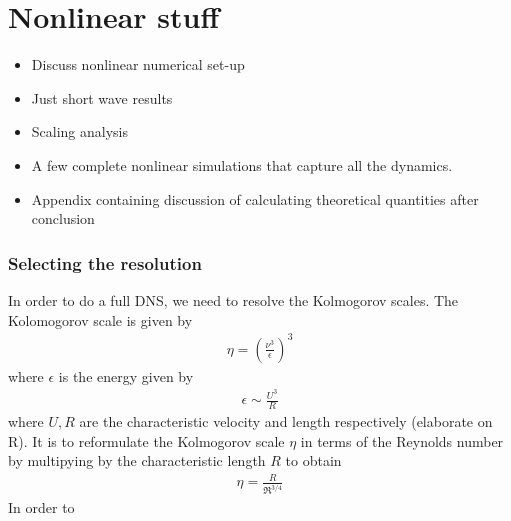 %
% 
\chapter{Nonlinear stuff}

\begin{itemize}
\item Discuss nonlinear numerical set-up
\item Just short wave results
\item Scaling analysis 
\item A few complete nonlinear simulations that capture all the dynamics.
\item Appendix containing discussion of calculating theoretical quantities after conclusion
\end{itemize}

\subsection{Selecting the resolution}

In order to do a full DNS, we need to resolve the Kolmogorov scales. The Kolomogorov scale is given by
\begin{align}
\eta = \left(\frac{\nu^{3}}{\epsilon}\right)^{3}
\end{align}
where $\epsilon$ is the energy given by
\begin{align}
\epsilon \sim \frac{U^{3}}{R} 
\end{align}
where $U,R$ are the characteristic velocity and length respectively (elaborate on R). It is to reformulate the Kolmogorov scale $\eta$ in terms of the Reynolds number by multipying by the characteristic length  $R$ to obtain
\begin{align}
\eta = \frac{R}{\Re^{3/4}}
\end{align}
In order to 


